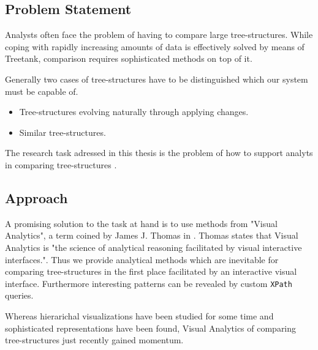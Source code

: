 \subsection{Problem Statement}\label{subsec::problem}
Analysts often face the problem of having to compare large tree-structures. While coping with rapidly increasing amounts of data is effectively solved by means of Treetank, comparison requires sophisticated methods on top of it. 

Generally two cases of tree-structures have to be distinguished which our system must be capable of.

\begin{itemize}
\item Tree-structures evolving naturally through applying changes.
\item Similar tree-structures.
\end{itemize}

The research task adressed in this thesis is the problem of how to support analyts in comparing tree-structures .

\subsection{Approach}
A promising solution to the task at hand is to use methods from "Visual Analytics", a term coined by James J. Thomas in \cite{VISUAL_ANALYTICS}. Thomas states that Visual Analytics is "the science of analytical reasoning facilitated by visual interactive interfaces.". Thus we provide analytical methods which are inevitable for comparing tree-structures in the first place facilitated by an interactive visual interface. Furthermore interesting patterns can be revealed by custom \texttt{XPath} queries.

Whereas hierarichal visualizations have been studied for some time and sophisticated representations have been found, Visual Analytics of comparing tree-structures just recently gained momentum.


